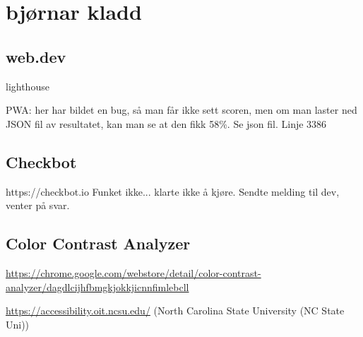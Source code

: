 \clearpage

\section{bjørnar kladd}

\subsection{web.dev}
lighthouse

PWA: her har bildet en bug, så man får ikke sett scoren, men om man laster ned JSON fil av resultatet, kan man se at den fikk 58\%.
Se json fil. Linje 3386

\subsection{Checkbot}
https://checkbot.io
Funket ikke... klarte ikke å kjøre.
Sendte melding til dev, venter på svar.

\subsection{Color Contrast Analyzer}
\url{https://chrome.google.com/webstore/detail/color-contrast-analyzer/dagdlcijhfbmgkjokkjicnnfimlebcll}

\url{https://accessibility.oit.ncsu.edu/} (North Carolina State University (NC State Uni))

